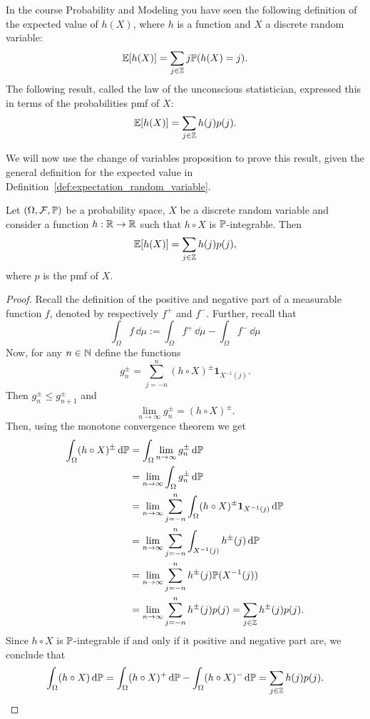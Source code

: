 In the course Probability and Modeling you have seen the following definition of the expected value of $h(X)$, where $h$ is a function and $X$ a discrete random variable:
\[
	\mathbb E[h(X)] = \sum_{j \in \mathbb Z} j \mathbb P(h(X) = j).
\]
The following result, called the law of the unconscious statistician, expressed this in terms of the probabilities pmf of $X$:
\[
	\mathbb E[h(X)] = \sum_{j \in \mathbb Z} h(j) p(j).
\] 

We will now use the change of variables proposition to prove this result, given the general definition for the expected value in Definition~\ref{def:expectation_random_variable}.


\begin{lemma}
Let $(\Omega, \mathcal F, \mathbb{P})$ be a probability space, $X$ be a discrete random variable and consider a function $h : \mathbb R \to \mathbb R$ such that $h\circ X$ is $\mathbb P$-integrable. Then
\[
	\mathbb E[h(X)] = \sum_{j \in \mathbb Z} h(j) p(j),
\] 
where $p$ is the pmf of $X$.
\end{lemma}

\begin{proof}
Recall the definition of the positive and negative part of a measurable function $f$, denoted by respectively $f^+$ and $f^-$. Further, recall that 
\[
	\int_\Omega f \, \dd \mu := \int_\Omega f^+ \, \dd \mu - \int_\Omega f^- \, \dd \mu 
\] 
Now, for any $n \in \mathbb N$ define the functions
\[
	g_n^\pm = \sum_{j = -n}^n (h \circ X)^\pm \mathbf{1}_{X^{-1}(j)}.
\]
Then $g_n^\pm \le g_{n+1}^\pm$ and
\[
	\lim_{n \to \infty} g_n^\pm = (h \circ X)^\pm.
\]
Then, using the monotone convergence theorem we get
\begin{align*}
	\int_\Omega (h \circ X)^\pm \, \mathrm{d} \mathbb P &= \int_\Omega \lim_{n \to \infty} g_n^\pm \, \mathrm{d} \mathbb P\\
	&= \lim_{n \to \infty} \int_\Omega g_n^\pm \, \mathrm{d} \mathbb P \\
	&= \lim_{n \to \infty} \sum_{j = -n}^n \int_\Omega (h \circ X)^\pm \mathbf{1}_{X^{-1}(j)} \, \mathrm{d} \mathbb P\\
	&= \lim_{n \to \infty} \sum_{j = -n}^n \int_{X^{-1}(j)} h^\pm(j) \, \mathrm{d} \mathbb P\\
	&= \lim_{n \to \infty} \sum_{j = -n}^n h^\pm(j) \mathbb P(X^{-1}(j)) \\
	&= \lim_{n \to \infty} \sum_{j = -n}^n h^\pm(j) p(j) = \sum_{j \in \mathbb Z} h^\pm(j) p(j).
\end{align*}
Since $h\circ X$ is $\mathbb P$-integrable if and only if it positive and negative part are, we conclude that
\[
	\int_\Omega (h \circ X) \, \mathrm{d} \mathbb P = \int_\Omega (h \circ X)^+ \, \mathrm{d} \mathbb P
	- \int_\Omega (h \circ X)^- \, \mathrm{d} \mathbb P = \sum_{j \in \mathbb Z} h(j) p(j).
\]
\end{proof}

